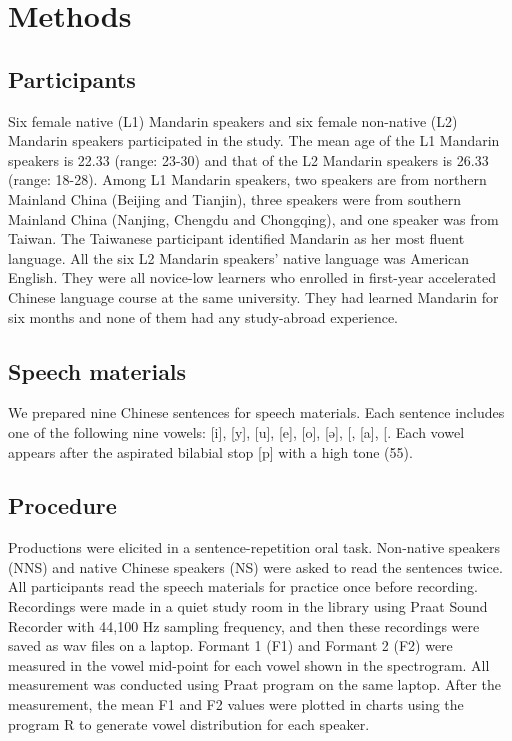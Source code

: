 \documentclass[man, fleqn, noextraspace]{apa6}
\begin{document}
\section{Methods}\label{methods}

\subsection{Participants}\label{participants}

Six female native (L1) Mandarin speakers and six female non-native (L2)
Mandarin speakers participated in the study. The mean age of the L1
Mandarin speakers is 22.33 (range: 23-30) and that of the L2 Mandarin
speakers is 26.33 (range: 18-28). Among L1 Mandarin speakers, two
speakers are from northern Mainland China (Beijing and Tianjin), three
speakers were from southern Mainland China (Nanjing, Chengdu and
Chongqing), and one speaker was from Taiwan. The Taiwanese participant
identified Mandarin as her most fluent language. All the six L2 Mandarin
speakers' native language was American English. They were all novice-low
learners who enrolled in first-year accelerated Chinese language course
at the same university. They had learned Mandarin for six months and
none of them had any study-abroad experience.

\subsection{Speech materials}\label{speech-materials}

We prepared nine Chinese sentences for speech materials. Each sentence
includes one of the following nine vowels: {[}i{]}, {[}y{]}, {[}u{]},
{[}e{]}, {[}o{]}, {[}ə{]}, {[}\ipatext{ɤ}{]}, {[}a{]},
{[}\ipatext{ɑ}{]}. Each vowel appears after the aspirated bilabial stop
{[}p{]} with a high tone (55).

\subsection{Procedure}\label{procedure}

Productions were elicited in a sentence-repetition oral task. Non-native
speakers (NNS) and native Chinese speakers (NS) were asked to read the
sentences twice. All participants read the speech materials for practice
once before recording. Recordings were made in a quiet study room in the
library using Praat Sound Recorder with 44,100 Hz sampling frequency,
and then these recordings were saved as wav files on a laptop. Formant 1
(F1) and Formant 2 (F2) were measured in the vowel mid-point for each
vowel shown in the spectrogram. All measurement was conducted using
Praat program on the same laptop. After the measurement, the mean F1 and
F2 values were plotted in charts using the program R to generate vowel
distribution for each speaker.
\end{document}
